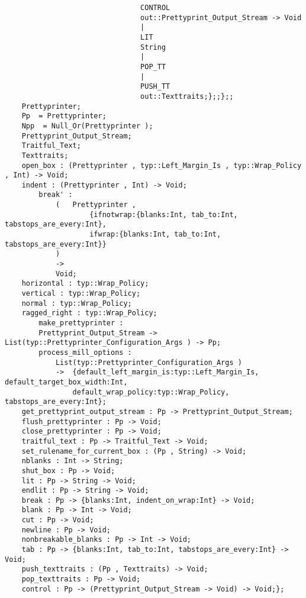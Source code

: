 \begin{verbatim}
                                CONTROL
                                out::Prettyprint_Output_Stream -> Void
                                |
                                LIT
                                String
                                |
                                POP_TT
                                |
                                PUSH_TT
                                out::Texttraits;};;};;
    Prettyprinter;
    Pp  = Prettyprinter;
    Npp  = Null_Or(Prettyprinter );
    Prettyprint_Output_Stream;
    Traitful_Text;
    Texttraits;
    open_box : (Prettyprinter , typ::Left_Margin_Is , typ::Wrap_Policy , Int) -> Void;
    indent : (Prettyprinter , Int) -> Void;
        break' :
            (   Prettyprinter ,
                    {ifnotwrap:{blanks:Int, tab_to:Int, tabstops_are_every:Int},
                    ifwrap:{blanks:Int, tab_to:Int, tabstops_are_every:Int}}
            )
            ->
            Void;
    horizontal : typ::Wrap_Policy;
    vertical : typ::Wrap_Policy;
    normal : typ::Wrap_Policy;
    ragged_right : typ::Wrap_Policy;
        make_prettyprinter :
        Prettyprint_Output_Stream -> List(typ::Prettyprinter_Configuration_Args ) -> Pp;
        process_mill_options :
            List(typ::Prettyprinter_Configuration_Args )
            ->  {default_left_margin_is:typ::Left_Margin_Is, default_target_box_width:Int,
                default_wrap_policy:typ::Wrap_Policy, tabstops_are_every:Int};
    get_prettyprint_output_stream : Pp -> Prettyprint_Output_Stream;
    flush_prettyprinter : Pp -> Void;
    close_prettyprinter : Pp -> Void;
    traitful_text : Pp -> Traitful_Text -> Void;
    set_rulename_for_current_box : (Pp , String) -> Void;
    nblanks : Int -> String;
    shut_box : Pp -> Void;
    lit : Pp -> String -> Void;
    endlit : Pp -> String -> Void;
    break : Pp -> {blanks:Int, indent_on_wrap:Int} -> Void;
    blank : Pp -> Int -> Void;
    cut : Pp -> Void;
    newline : Pp -> Void;
    nonbreakable_blanks : Pp -> Int -> Void;
    tab : Pp -> {blanks:Int, tab_to:Int, tabstops_are_every:Int} -> Void;
    push_texttraits : (Pp , Texttraits) -> Void;
    pop_texttraits : Pp -> Void;
    control : Pp -> (Prettyprint_Output_Stream -> Void) -> Void;};
\end{verbatim}
